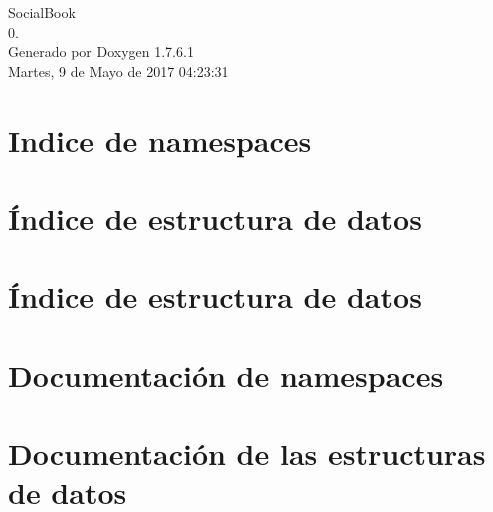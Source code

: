 \documentclass[a4paper]{book}
\begin{document}
\hypersetup{pageanchor=false,citecolor=blue}
\begin{titlepage}
\vspace*{7cm}
\begin{center}
{\Large \-Social\-Book \\[1ex]\large 0. }\\
\vspace*{1cm}
{\large \-Generado por Doxygen 1.7.6.1}\\
\vspace*{0.5cm}
{\small Martes, 9 de Mayo de 2017 04:23:31}\\
\end{center}
\end{titlepage}
\clearemptydoublepage
{}
\tableofcontents
\clearemptydoublepage
{}
\hypersetup{pageanchor=true,citecolor=blue}
\chapter{\-Indice de namespaces}

\chapter{Índice de estructura de datos}

\chapter{Índice de estructura de datos}

\chapter{\-Documentación de namespaces}

\chapter{\-Documentación de las estructuras de datos}
































\printindex
\end{document}
